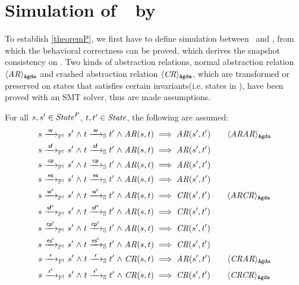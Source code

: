 
\section{Simulation of~\ProgInv\ by~\Spec}
\label{sec:sim}
To establish \cref{theoremP}, we first have to define simulation between \Spec\ and \Prog, from which the behavioral correctness  can be proved, which derives the snapshot consistency on \Prog. Two kinds of abstraction relations, normal abstraction relation $\langle \mathit{AR} \rangle_\mathtt{Agda}$ and crashed abstraction relation $\langle \mathit{CR} \rangle_\mathtt{Agda}$, which are transformed or preserved on states that satisfies certain invariants(i.e. states in \ProgInv), have been proved with an SMT solver, thus are made assumptions.
\begin{assumption}\label{PerOpCorrect}
	For all $s, s' \in \mathit{State}^P$, $t, t' \in \mathit{State}$, the following are assumed:
\begin{align*}
s \ttPI{\awa{\actw}{\actw }} s' \conj t \ttS{\awa{\actw}{\actw }} t' \conj \i{AR}(s, t) &\implies \i{AR}(s', t') \tag*{\AgdaId{\id{ARAR}}}\\
s \ttPI{\awa{\actw}{\actf }} s' \conj t \ttS{\awa{\actw}{\actf }} t' \conj \i{AR}(s, t) &\implies \i{AR}(s', t')\\
s \ttPI{\awa{\actw}{\actcp}} s' \conj t \ttS{\awa{\actw}{\actcp}} t' \conj \i{AR}(s, t) &\implies \i{AR}(s', t')\\
s \ttPI{\awa{\actw}{\actes}} s' \conj t \ttS{\awa{\actw}{\actes}} t' \conj \i{AR}(s, t) &\implies \i{AR}(s', t')\\
s \ttPI{\awa{\actw}{\actwc}} s' \conj t \ttS{\awa{\actw}{\actwc}} t' \conj \i{AR}(s, t) &\implies \i{CR}(s', t')\tag*{\AgdaId{\id{ARCR}}}\\
s \ttPI{\awa{\actw}{\actfc}} s' \conj t \ttS{\awa{\actw}{\actfc}} t' \conj \i{AR}(s, t) &\implies \i{CR}(s', t')\\
s \ttPI{\awa{\actw}{\actcpc}} s' \conj t \ttS{\awa{\actw}{\actcpc}} t' \conj \i{AR}(s, t) &\implies \i{CR}(s', t')\\
s \ttPI{\awa{\actw}{\actesc}} s' \conj t \ttS{\awa{\actw}{\actesc}} t' \conj \i{AR}(s, t) &\implies \i{CR}(s', t')\\
s \ttPI{\awa{\actw}{\actr }} s' \conj t \ttS{\awa{\actw}{\actr }} t' \conj \i{CR}(s, t) &\implies \i{AR}(s', t')\tag*{\AgdaId{\id{CRAR}}}\\
s \ttPI{\awa{\actw}{\actrc}} s' \conj t \ttS{\awa{\actw}{\actrc}} t' \conj \i{CR}(s, t) &\implies \i{CR}(s', t')\tag*{\AgdaId{\id{CRCR}}}
\end{align*}
\end{assumption}
